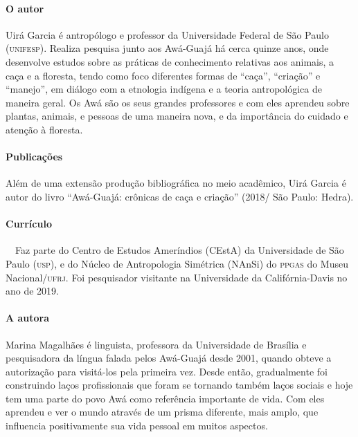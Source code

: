 \documentclass[11pt]{extarticle}
\begin{document}
\reversemarginpar
\marginparwidth=5cm


\paragraph{O autor} 
Uirá Garcia é antropólogo e professor da Universidade Federal de São Paulo (\textsc{unifesp}). Realiza pesquisa junto aos Awá-Guajá há cerca quinze anos, onde desenvolve estudos sobre as práticas de conhecimento relativas aos animais, a caça e a floresta, tendo como foco diferentes formas de “caça”, “criação” e “manejo”, em diálogo com a etnologia indígena e a teoria antropológica de maneira geral. Os Awá são os seus grandes professores e com eles aprendeu sobre plantas, animais, e pessoas de uma maneira nova, e da importância do cuidado e atenção à floresta. 


\paragraph{Publicações} 
Além de uma extensão produção bibliográfica no meio acadêmico, Uirá Garcia é autor do livro ``Awá-Guajá: crônicas de caça e criação'' (2018/ São Paulo: Hedra).
\paragraph{Currículo} 
 Faz parte do Centro de Estudos Ameríndios (CEstA) da Universidade de São Paulo (\textsc{usp}), e do Núcleo de Antropologia Simétrica (NAnSi) do \textsc{ppgas} do Museu Nacional/\textsc{ufrj}. Foi pesquisador visitante na Universidade da Califórnia-Davis no ano de 2019.

\paragraph{A autora}
Marina Magalhães é linguista, professora da Universidade de Brasília e pesquisadora da língua falada pelos Awá-Guajá desde 2001, quando obteve a autorização para visitá-los pela primeira vez. Desde então, gradualmente foi construindo laços profissionais que foram se tornando também laços sociais e hoje tem uma parte do povo Awá como referência importante de vida. Com eles aprendeu e ver o mundo através de um prisma diferente, mais amplo, que influencia positivamente sua vida pessoal em muitos aspectos. 
\end{document}
